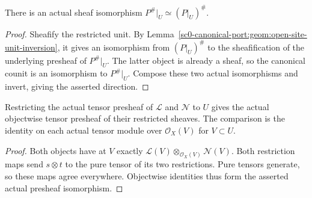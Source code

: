 \begin{theorem}
\label{sc0-canonical-port:geom:sheafification-open-restriction}
\leanok
There is an actual sheaf isomorphism
\(P^\#|_U\simeq(P|_U)^\#\).
\end{theorem}
\begin{proof}
Sheafify the restricted unit. By
Lemma~\ref{sc0-canonical-port:geom:open-site-unit-inversion}, it gives an
isomorphism from \((P|_U)^\#\) to the sheafification
of the underlying presheaf of \(P^\#|_U\). The latter
object is already a sheaf, so the canonical counit is an
isomorphism to \(P^\#|_U\). Compose these two actual
isomorphisms and invert, giving the asserted direction.
\end{proof}

\begin{lemma}
\label{sc0-canonical-port:geom:tensor-presheaf-open-restriction}
\leanok
Restricting the actual tensor presheaf of \(\mathcal L\)
and \(\mathcal N\) to \(U\) gives the actual objectwise
tensor presheaf of their restricted sheaves. The comparison
is the identity on each actual tensor module over
\(\mathcal O_X(V)\) for \(V\subset U\).
\end{lemma}
\begin{proof}
Both objects have at \(V\) exactly
\(\mathcal L(V)\otimes_{\mathcal O_X(V)}\mathcal N(V)\).
Both restriction maps send \(s\otimes t\) to the pure
tensor of its two restrictions. Pure tensors generate, so
these maps agree everywhere. Objectwise identities thus
form the asserted actual presheaf isomorphism.
\end{proof}

